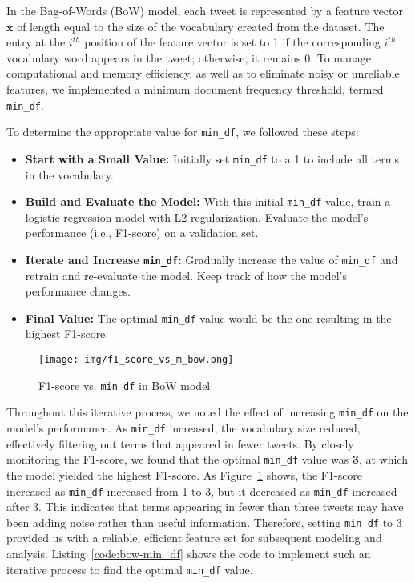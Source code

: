 \documentclass{article}
\begin{document}
In the Bag-of-Words (BoW) model, each tweet is represented by a feature vector \( \textbf{x} \) of length equal to the size of the vocabulary created from the dataset. The entry at the \( i^{th} \) position of the feature vector is set to 1 if the corresponding \( i^{th} \) vocabulary word appears in the tweet; otherwise, it remains 0. To manage computational and memory efficiency, as well as to eliminate noisy or unreliable features, we implemented a minimum document frequency threshold, termed \texttt{min\_df}.

To determine the appropriate value for \texttt{min\_df}, we followed these steps:

\begin{itemize}
    \item \textbf{Start with a Small Value:} Initially set \texttt{min\_df} to a 1 to include all terms in the vocabulary.
    
    \item \textbf{Build and Evaluate the Model:} With this initial \texttt{min\_df} value, train a logistic regression model with L2 regularization. Evaluate the model's performance (i.e., F1-score) on a validation set.
    
    \item \textbf{Iterate and Increase \texttt{min\_df}:} Gradually increase the value of \texttt{min\_df} and retrain and re-evaluate the model. Keep track of how the model's performance changes.
    
    \item \textbf{Final Value:} The optimal \texttt{min\_df} value would be the one resulting in the highest F1-score.
\end{itemize}

\begin{figure}[!htbp]
    \centering
    \texttt{[image: img/f1\_score\_vs\_m\_bow.png]}
    \caption{F1-score vs. \texttt{min\_df} in BoW model}
    \label{fig:bow-min_df}
\end{figure}

Throughout this iterative process, we noted the effect of increasing \texttt{min\_df} on the model's performance. As \texttt{min\_df} increased, the vocabulary size reduced, effectively filtering out terms that appeared in fewer tweets. By closely monitoring the F1-score, we found that the optimal \texttt{min\_df} value was \textbf{3}, at which the model yielded the highest F1-score. As Figure~\ref{fig:bow-min_df} shows, the F1-score increased as \texttt{min\_df} increased from 1 to 3, but it decreased as \texttt{min\_df} increased after 3. This indicates that terms appearing in fewer than three tweets may have been adding noise rather than useful information. Therefore, setting \texttt{min\_df} to 3 provided us with a reliable, efficient feature set for subsequent modeling and analysis. Listing~\ref{code:bow-min_df} shows the code to implement such an iterative process to find the optimal \texttt{min\_df} value.
\end{document}
